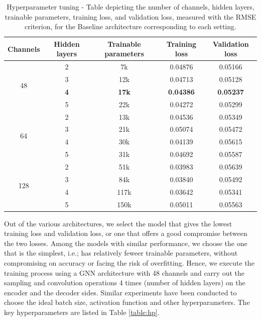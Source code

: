 \begin{table}[ht]
    \centering
    \caption{Hyperparameter tuning - Table depicting the number of channels, hidden layers, trainable parameters, training loss, and validation loss, measured with the RMSE criterion, for the Baseline architecture corresponding to each setting.}
    \label{table:complex}
    \begin{tabular}{|c|c|c|c|c|}
    \hline
    \textbf{Channels} & \textbf{Hidden layers} & \textbf{Trainable parameters} & \textbf{Training loss} & \textbf{Validation loss}\\
    \hline
    \multirow{4}{*}{48} & 2 & 7k &  0.04876&  0.05166\\
    \cline{2-5}
                        & 3 & 12k &  0.04713&  0.05128\\
    \cline{2-5}
                        & \textbf{4} & \textbf{17k} & \textbf{0.04386}&  \textbf{0.05237}\\
    \cline{2-5}
                        & 5 & 22k &  0.04272 &  0.05299\\
    \hline
    \multirow{4}{*}{64} & 2 & 13k & 0.04536&  0.05349\\
    \cline{2-5}
                        & 3 & 21k & 0.05074 &  0.05472\\
    \cline{2-5}
                        & 4 & 30k &  0.04139&  0.05615\\
    \cline{2-5}
                        & 5 & 31k & 0.04692 &  0.05587\\
    \hline
    \multirow{4}{*}{128} & 2 & 51k& 0.03983&  0.05639\\
    \cline{2-5}         
                         & 3 & 84k & 0.03840&  0.05492\\
    \cline{2-5}
                         & 4 & 117k & 0.03642 &  0.05341 \\
    \cline{2-5}
                         & 5 & 150k &  0.05011&  0.05563\\
    \hline
    \end{tabular}
    
    \end{table}
Out of the various architectures, we select the model that gives the lowest training loss and validation loss, or one that offers a good compromise between the two losses. Among the models with similar performance, we choose the one that is the simplest, i.e.; has relatively feweer trainable parameters, without compromising on accuracy or facing the risk of overfitting. Hence, we execute the training process using a GNN architecture with 48 channels and carry out the sampling and convolution operations 4 times (number of hidden layers) on the encoder and the decoder sides. Similar experiments have been conducted to choose the ideal batch size, activation function and other hyperparameters. The key hyperparameters are listed in Table \ref{table:hp}. 
